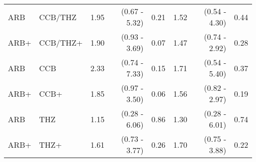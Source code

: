 \documentclass[11pt,]{article}
\begin{document}
\begin{table}[H]
{\begin{tabular}{llrrrrrr}
  ARB & CCB/THZ & 1.95 & (0.67 - 5.32) & 0.21 & 1.52 & (0.54 - 4.30) & 0.44 \\ 
  ARB+ & CCB/THZ+ & 1.90 & (0.93 - 3.69) & 0.07 & 1.47 & (0.74 - 2.92) & 0.28 \\ 
  ARB & CCB & 2.33 & (0.74 - 7.33) & 0.15 & 1.71 & (0.54 - 5.40) & 0.37 \\ 
  ARB+ & CCB+ & 1.85 & (0.97 - 3.50) & 0.06 & 1.56 & (0.82 - 2.97) & 0.19 \\ 
  ARB & THZ & 1.15 & (0.28 - 6.06) & 0.86 & 1.30 & (0.28 - 6.01) & 0.74 \\ 
  ARB+ & THZ+ & 1.61 & (0.73 - 3.77) & 0.26 & 1.70 & (0.75 - 3.88) & 0.22 \\ 
    \bottomrule
  \end{tabular}
  }
\end{table}
\begin{table}[H]
 \caption{Risk estimates for PAAS across propensity score stratifed, prevalent-user cohorts in the CUIMC data source. We report uncalibrated and calibrated hazard ratios (HRs) and their 95\% confidence intervals (CIs). (+) indicates in-combination cohorts.}
\end{table}
\end{document}
